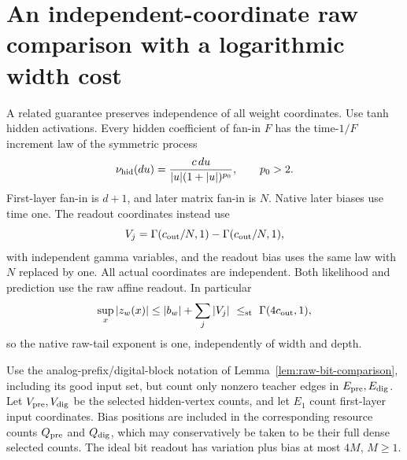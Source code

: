\section{An independent-coordinate raw comparison with a logarithmic width cost}
\label{sec:independent-raw-bits}
A related guarantee preserves independence of all weight coordinates.
Use tanh hidden activations. Every hidden coefficient of fan-in $F$
has the time-$1/F$ increment law of the symmetric process
\[
 \nu_{\rm hid}(du)=
 \frac{c\,du}{|u|(1+|u|)^{p_0}},\qquad p_0>2.
\]
First-layer fan-in is $d+1$, and later matrix fan-in is $N$.
Native later biases use time one. The readout coordinates instead use
\[
 V_j=\Gamma(c_{\rm out}/N,1)-\Gamma(c_{\rm out}/N,1),
\]
with independent gamma variables, and the readout bias uses the
same law with $N$ replaced by one. All actual coordinates are
independent. Both likelihood and prediction use the raw affine
readout. In particular
\[
 \sup_x|z_w(x)|\le |b_w|+\sum_j|V_j|
 \ \le_{\rm st}\ \Gamma(4c_{\rm out},1),
\]
so the native raw-tail exponent is one, independently of width
and depth.

Use the analog-prefix/digital-block notation of
Lemma~\ref{lem:raw-bit-comparison}, including its good input set,
but count only nonzero teacher edges in $E_{\rm pre},E_{\rm dig}$.
Let $V_{\rm pre},V_{\rm dig}$ be the selected hidden-vertex counts,
and let $E_1$ count first-layer input coordinates. Bias positions
are included in the corresponding resource counts $Q_{\rm pre}$ and
$Q_{\rm dig}$, which may conservatively be taken to be their full
dense selected counts. The ideal bit readout has variation plus
bias at most $4M$, $M\ge1$.

